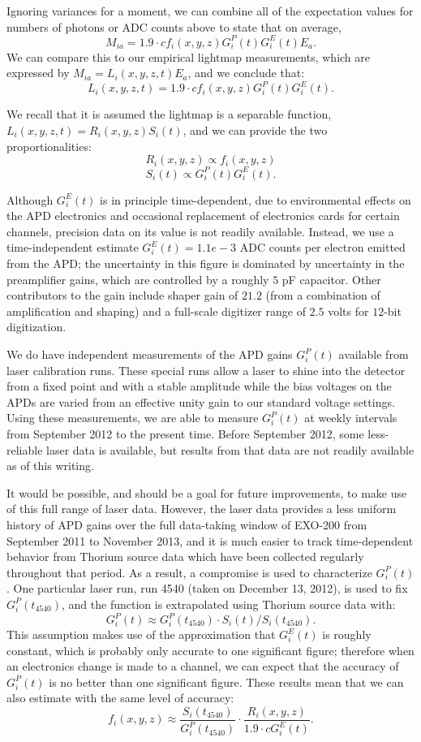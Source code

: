 Ignoring variances for a moment, we can combine all of the expectation values for numbers of photons or ADC counts above to state that on average,
\[M_{ia} = 1.9 \cdot c f_i(x,y,z) G^P_i(t) G^E_i(t) E_a.\]
We can compare this to our empirical lightmap measurements, which are expressed by $M_{ia} = L_i(x,y,z,t) E_a$,
and we conclude that:
\[ L_i(x,y,z,t) = 1.9 \cdot c f_i(x,y,z) G^P_i(t) G^E_i(t).\]

We recall that it is assumed the lightmap is a separable function, $L_i(x,y,z,t) = R_i(x,y,z)S_i(t)$, and we can provide the two proportionalities:
\[ R_i(x,y,z) \propto f_i(x,y,z) \]
\[ S_i(t) \propto G^P_i(t) G^E_i(t).\]

Although $G^E_i(t)$ is in principle time-dependent, due to environmental effects on the APD electronics and occasional replacement of electronics cards for certain channels, precision data on its value is not readily available.  Instead, we use a time-independent estimate $G^E_i(t) = 1.1e-3$ ADC counts per electron emitted from the APD; the uncertainty in this figure is dominated by uncertainty in the preamplifier gains, which are controlled by a roughly $5$ pF capacitor.  Other contributors to the gain include shaper gain of $21.2$ (from a combination of amplification and shaping) and a full-scale digitizer range of $2.5$ volts for $12$-bit digitization.

We do have independent measurements of the APD gains $G^P_i(t)$ available from laser calibration runs.  These special runs allow a laser to shine into the detector from a fixed point and with a stable amplitude while the bias voltages on the APDs are varied from an effective unity gain to our standard voltage settings.  Using these measurements, we are able to measure $G^P_i(t)$ at weekly intervals from September 2012 to the present time.  Before September 2012, some less-reliable laser data is available, but results from that data are not readily available as of this writing.

It would be possible, and should be a goal for future improvements, to make use of this full range of laser data.  However, the laser data provides a less uniform history of APD gains over the full data-taking window of EXO-200 from September 2011 to November 2013, and it is much easier to track time-dependent behavior from Thorium source data which have been collected regularly throughout that period.  As a result, a compromise is used to characterize $G^P_i(t)$.  One particular laser run, run 4540 (taken on December 13, 2012), is used to fix $G^P_i(t_{4540})$, and the function is extrapolated using Thorium source data with:
\[G^P_i(t) \approx G^P_i(t_{4540}) \cdot S_i(t)/S_i(t_{4540}).\]
This assumption makes use of the approximation that $G^E_i(t)$ is roughly constant, which is probably only accurate to one significant figure; therefore when an electronics change is made to a channel, we can expect that the accuracy of $G^P_i(t)$ is no better than one significant figure.  These results mean that we can also estimate with the same level of accuracy:
\[f_i(x,y,z) \approx \frac{S_i(t_{4540})}{G^P_i(t_{4540})} \cdot \frac{R_i(x,y,z)}{1.9 \cdot c G^E_i(t)}.\]


